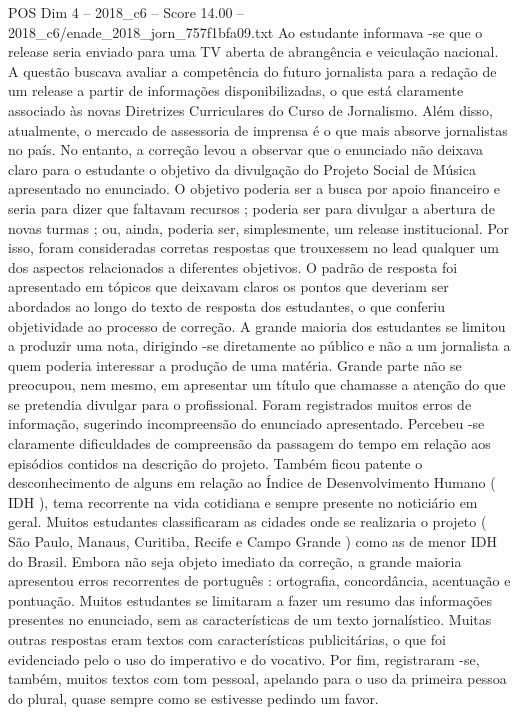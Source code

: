\begin{textsample}{POS Dim 4 – 2018\_c6 – Score 14.00 – 2018\_c6/enade\_2018\_jorn\_757f1bfa09.txt}
Ao estudante informava -se que o release seria enviado para uma TV aberta de abrangência e veiculação nacional.
A questão buscava avaliar a competência do futuro jornalista para a redação de um release a partir de informações disponibilizadas, o que está claramente associado às novas Diretrizes Curriculares do Curso de Jornalismo.
Além disso, atualmente, o mercado de assessoria de imprensa é o que mais absorve jornalistas no país.
No entanto, a correção levou a observar que o enunciado não deixava claro para o estudante o objetivo da divulgação do Projeto Social de Música apresentado no enunciado.
O objetivo poderia ser a busca por apoio financeiro e seria para dizer que faltavam recursos ; poderia ser para divulgar a abertura de novas turmas ; ou, ainda, poderia ser, simplesmente, um release institucional.
Por isso, foram consideradas corretas respostas que trouxessem no lead qualquer um dos aspectos relacionados a diferentes objetivos.
O padrão de resposta foi apresentado em tópicos que deixavam claros os pontos que deveriam ser abordados ao longo do texto de resposta dos estudantes, o que conferiu objetividade ao processo de correção.
A grande maioria dos estudantes se limitou a produzir uma nota, dirigindo -se diretamente ao público e não a um jornalista a quem poderia interessar a produção de uma matéria.
Grande parte não se preocupou, nem mesmo, em apresentar um título que chamasse a atenção do que se pretendia divulgar para o profissional.
Foram registrados muitos erros de informação, sugerindo incompreensão do enunciado apresentado.
Percebeu -se claramente dificuldades de compreensão da passagem do tempo em relação aos episódios contidos na descrição do projeto.
Também ficou patente o desconhecimento de alguns em relação ao Índice de Desenvolvimento Humano ( IDH ), tema recorrente na vida cotidiana e sempre presente no noticiário em geral.
Muitos estudantes classificaram as cidades onde se realizaria o projeto ( São Paulo, Manaus, Curitiba, Recife e Campo Grande ) como as de menor IDH do Brasil.
Embora não seja objeto imediato da correção, a grande maioria apresentou erros recorrentes de português : ortografia, concordância, acentuação e pontuação.
Muitos estudantes se limitaram a fazer um resumo das informações presentes no enunciado, sem as características de um texto jornalístico.
Muitas outras respostas eram textos com características publicitárias, o que foi evidenciado pelo o uso do imperativo e do vocativo.
Por fim, registraram -se, também, muitos textos com tom pessoal, apelando para o uso da primeira pessoa do plural, quase sempre como se estivesse pedindo um favor.

\end{textsample}

